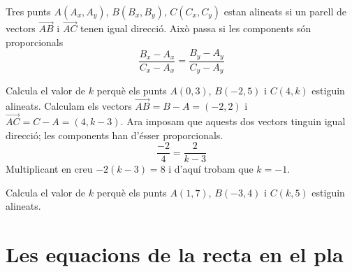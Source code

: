 \documentclass[11pt, a4paper, pdf]{article}
\begin{document}
\begin{theorybox}

	Tres punts $A(A_x, A_y)$, $B(B_x, B_y)$, $C(C_x, C_y)$ estan alineats si un parell de vectors $\overrightarrow{AB}$ i $\overrightarrow{AC}$ tenen igual direcció. Això passa si les components són proporcionals
	\begin{equation}
	\frac{B_x-A_x}{C_x-A_x}=\frac{B_y-A_y}{C_y-A_y}
	\end{equation}
\end{theorybox}


\begin{resolt}{Calcula el valor de $k$ perquè els punts $A(0,3)$, $B(-2, 5)$ i $C(4, k)$ estiguin alineats.}
	Calculam els vectors $\overrightarrow{AB}=B-A=(-2, 2)$ i $\overrightarrow{AC}=C-A=(4,k-3)$. Ara imposam que aquests dos vectors tinguin igual direcció; les components han d'ésser proporcionals.
	\begin{equation*}
	\frac{-2}{4}=\frac{2}{k-3}
	\end{equation*}
	Multiplicant en creu $-2(k-3)=8$ i d'aquí trobam que $k=-1$.
\end{resolt}




\begin{mylist}
		\item Calcula el valor de $k$ perquè els punts $A(1,7)$, $B(-3,4)$ i $C(k,5)$ estiguin alineats.
	
\end{mylist}


\section{Les equacions de la recta en el pla}
\end{document}
